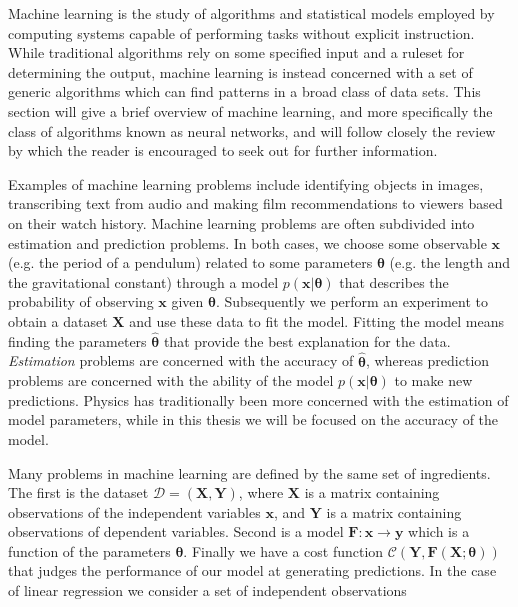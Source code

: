 Machine learning is the study of algorithms and 
statistical models employed by computing systems
capable of performing tasks without explicit instruction.
While traditional algorithms rely on some specified input 
and a ruleset for determining the output, machine learning
is instead concerned with a set of generic algorithms which can find patterns
in a broad class of data sets.
This section will give a brief overview of machine learning,
and more specifically the class of algorithms known as neural networks,
and will follow closely the review by
\parencite[Mehta et al.][pages 1-64]{mehta2019high}
which the reader is encouraged to seek out for further information.
\par
Examples of machine learning problems include identifying objects in images,
transcribing text from audio and making film recommendations to viewers 
based on their watch history.
Machine learning problems are often subdivided into 
estimation and prediction problems.
In both cases, we choose some observable 
$\bm{x}$ (e.g. the period of a pendulum)
related to some parameters $\bm{\theta}$ 
(e.g. the length and the gravitational constant)
through a model $p(\bm{x} \lvert \bm{\theta})$ 
that describes the probability of observing
$\bm{x}$ given $\bm{\theta}$. 
Subsequently we perform an experiment to obtain a dataset
$\bm{X}$ and use these data to fit the model. 
Fitting the model means finding the parameters 
$\hat{\bm{\theta}}$ that provide the best explanation for the data. 
\textit{Estimation} problems are concerned with the accuracy of 
$\hat{\bm{\theta}}$, whereas prediction problems are concerned with 
the ability of the model $p(\bm{x} \lvert \bm{\theta})$
to make new predictions.
Physics has traditionally been more concerned with the estimation 
of model parameters, while in this thesis we will be focused 
on the accuracy of the model.
\par
Many problems in machine learning are defined by the same set of ingredients.
The first is the dataset $\mathcal{D} = (\bm{X}, \bm{Y})$,
where $\bm{X}$ is a matrix containing observations of the 
independent variables $\bm{x}$, and $\bm{Y}$ is a matrix containing
observations of dependent variables.
Second is a model $\bm{F}: \bm{x} \rightarrow \bm{y}$
which is a function of the parameters $\bm{\theta}$. 
Finally we have a cost function
$\mathcal{C}\left(\bm{Y}, \bm{F}\left(\bm{X} ; \bm{\theta}\right)\right)$
that judges the performance of our model at generating predictions.
\newline
In the case of linear regression we consider a set of independent observations
